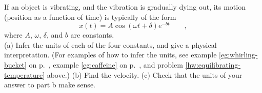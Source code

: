 If an object is vibrating, and the vibration is gradually dying out,
its motion (position as a function of time) is typically of the form
\begin{equation*}
  x(t) = A\cos(\omega t+\delta)e^{-bt} \qquad ,
\end{equation*}
where $A$, $\omega$, $\delta$, and $b$ are constants.\\
(a) Infer the units of each of the four constants, and give a physical interpretation.
(For examples of how to infer the units, see
example \ref{eg:whirling-bucket} on p.~\pageref{eg:whirling-bucket},
example \ref{eg:caffeine} on p.~\pageref{eg:caffeine},
and problem \ref{hw:equilibrating-temperature} above.)
\hwendpart
(b) Find the velocity.\hwendpart
(c) Check that the units of your answer to part b make sense.\answercheck\hwendpart
